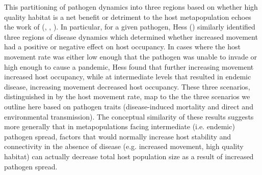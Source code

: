 \documentclass{article}
\begin{document}
This partitioning of pathogen dynamics into three regions based on whether high quality habitat is a net benefit or detriment to the host metapopulation echoes the work of (\cite{Hess1996}, \cite{Gog2002}, \cite{Park2012}).
In particular, for a given pathogen, Hess (\cite{Hess1996}) similarly identified three regions of disease dynamics which determined whether increased movement had a positive or negative effect on host occupancy.  
In cases where the host movement rate was either low enough that the pathogen was unable to invade or high enough to cause a pandemic, Hess found that further increasing movement increased host occupancy, while at intermediate levels that resulted in endemic disease, increasing movement decreased host occupancy.
These three scenarios, distinguished in \cite{Hess1996} by the host movement rate, map to the the three scenarios we outline here based on pathogen traits (disease-induced mortality and direct and environmental transmission).
The conceptual similarity of these results suggests more generally that in metapopulations facing intermediate (i.e. endemic) pathogen spread, factors that would normally increase host stability and connectivity in the absence of disease (e.g. increased movement, high quality habitat) can actually decrease total host population size as a result of increased pathogen spread.
\end{document}
